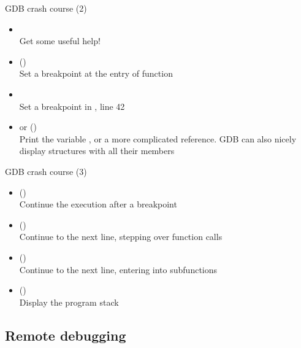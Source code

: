 \begin{frame}{GDB crash course (2)}
  \begin{itemize}
  \item {}\\
    Get some useful help!
  \item {} ()\\
    Set a breakpoint at the entry of function 
  \item {}\\
    Set a breakpoint in , line 42
  \item {} or  ()\\
    Print the variable , or a more complicated reference. GDB
    can also nicely display structures with all their members
  \end{itemize}
\end{frame}

\begin{frame}{GDB crash course (3)}
  \begin{itemize}
  \item {} ()\\
    Continue the execution after a breakpoint
  \item {} ()\\
    Continue to the next line, stepping over function calls
  \item {} ()\\
    Continue to the next line, entering into subfunctions
  \item {} ()\\
    Display the program stack
  \end{itemize}
\end{frame}

\subsection{Remote debugging}


